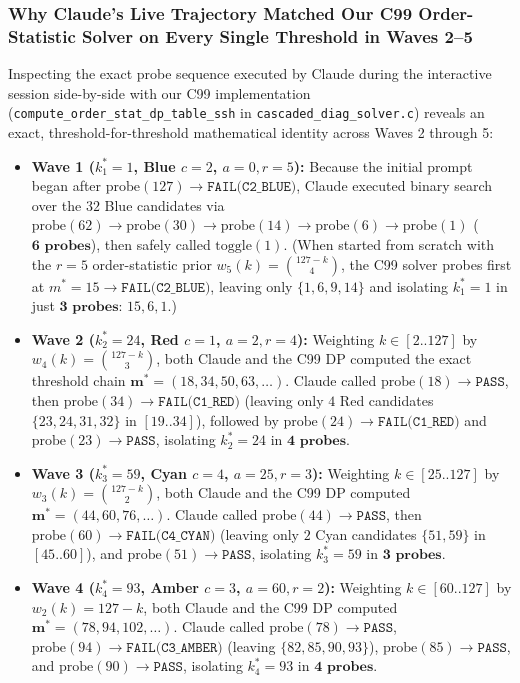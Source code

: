 \documentclass[11pt,a4paper]{article}
\theoremstyle{definition}
\theoremstyle{remark}
\begin{document}
\subsubsection*{Why Claude's Live Trajectory Matched Our C99 Order-Statistic Solver on Every Single Threshold in Waves 2--5}
Inspecting the exact probe sequence executed by Claude during the interactive session side-by-side with our C99 implementation (\texttt{compute\_order\_stat\_dp\_table\_ssh} in \texttt{cascaded\_diag\_solver.c}) reveals an exact, threshold-for-threshold mathematical identity across Waves 2 through 5:
\begin{itemize}
    \item \textbf{Wave 1 ($k^*_1 = 1$, Blue $c=2$, $a=0, r=5$):} Because the initial prompt began after $\text{probe}(127) \to \texttt{FAIL(C2\_BLUE)}$, Claude executed binary search over the $32$ Blue candidates via $\text{probe}(62) \to \text{probe}(30) \to \text{probe}(14) \to \text{probe}(6) \to \text{probe}(1)$ ($\mathbf{6\text{ probes}}$), then safely called $\text{toggle}(1)$. (When started from scratch with the $r=5$ order-statistic prior $w_5(k) = \binom{127-k}{4}$, the C99 solver probes first at $m^* = 15 \to \texttt{FAIL(C2\_BLUE)}$, leaving only $\{1, 6, 9, 14\}$ and isolating $k^*_1 = 1$ in just $\mathbf{3\text{ probes}}$: $15, 6, 1$.)
    \item \textbf{Wave 2 ($k^*_2 = 24$, Red $c=1$, $a=2, r=4$):} Weighting $k \in [2..127]$ by $w_4(k) = \binom{127-k}{3}$, both Claude and the C99 DP computed the exact threshold chain $\bm{m}^* = (18, 34, 50, 63, \dots)$. Claude called $\text{probe}(18) \to \texttt{PASS}$, then $\text{probe}(34) \to \texttt{FAIL(C1\_RED)}$ (leaving only $4$ Red candidates $\{23, 24, 31, 32\}$ in $[19..34]$), followed by $\text{probe}(24) \to \texttt{FAIL(C1\_RED)}$ and $\text{probe}(23) \to \texttt{PASS}$, isolating $k^*_2 = 24$ in $\mathbf{4\text{ probes}}$.
    \item \textbf{Wave 3 ($k^*_3 = 59$, Cyan $c=4$, $a=25, r=3$):} Weighting $k \in [25..127]$ by $w_3(k) = \binom{127-k}{2}$, both Claude and the C99 DP computed $\bm{m}^* = (44, 60, 76, \dots)$. Claude called $\text{probe}(44) \to \texttt{PASS}$, then $\text{probe}(60) \to \texttt{FAIL(C4\_CYAN)}$ (leaving only $2$ Cyan candidates $\{51, 59\}$ in $[45..60]$), and $\text{probe}(51) \to \texttt{PASS}$, isolating $k^*_3 = 59$ in $\mathbf{3\text{ probes}}$.
    \item \textbf{Wave 4 ($k^*_4 = 93$, Amber $c=3$, $a=60, r=2$):} Weighting $k \in [60..127]$ by $w_2(k) = 127 - k$, both Claude and the C99 DP computed $\bm{m}^* = (78, 94, 102, \dots)$. Claude called $\text{probe}(78) \to \texttt{PASS}$, $\text{probe}(94) \to \texttt{FAIL(C3\_AMBER)}$ (leaving $\{82, 85, 90, 93\}$), $\text{probe}(85) \to \texttt{PASS}$, and $\text{probe}(90) \to \texttt{PASS}$, isolating $k^*_4 = 93$ in $\mathbf{4\text{ probes}}$.

\end{itemize}
\end{document}
